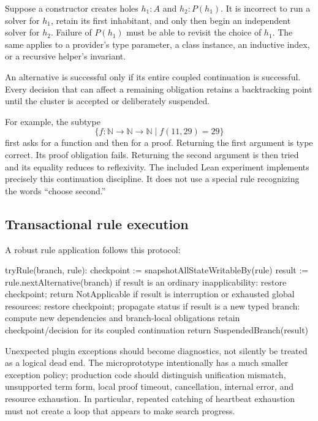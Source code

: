 Suppose a constructor creates holes $h_1:A$ and $h_2:P(h_1)$. It is incorrect to
run a solver for $h_1$, retain its first inhabitant, and only then begin an
independent solver for $h_2$. Failure of $P(h_1)$ must be able to revisit the
choice of $h_1$. The same applies to a provider's type parameter, a class
instance, an inductive index, or a recursive helper's invariant.

\begin{invariant}\label{inv:continuation}
An alternative is successful only if its entire coupled continuation is
successful. Every decision that can affect a remaining obligation retains a
backtracking point until the cluster is accepted or deliberately suspended.
\end{invariant}

For example, the subtype
\[
 \{f:\mathbb N\to\mathbb N\to\mathbb N\mid f(11,29)=29\}
\]
first asks for a function and then for a proof. Returning the first argument is
type correct. Its proof obligation fails. Returning the second argument is then
tried and its equality reduces to reflexivity. The included Lean experiment
implements precisely this continuation discipline. It does not use a special
rule recognizing the words ``choose second.''

\subsection{Transactional rule execution}

A robust rule application follows this protocol:
\begin{Code}
tryRule(branch, rule):
  checkpoint := snapshotAllStateWritableBy(rule)
  result := rule.nextAlternative(branch)
  if result is an ordinary inapplicability:
      restore checkpoint; return NotApplicable
  if result is interruption or exhausted global resources:
      restore checkpoint; propagate status
  if result is a new typed branch:
      compute new dependencies and branch-local obligations
      retain checkpoint/decision for its coupled continuation
      return SuspendedBranch(result)
\end{Code}

Unexpected plugin exceptions should become diagnostics, not silently be treated
as a logical dead end. The microprototype intentionally has a much smaller
exception policy; production code should distinguish unification mismatch,
unsupported term form, local proof timeout, cancellation, internal error, and
resource exhaustion. In particular, repeated catching of heartbeat exhaustion
must not create a loop that appears to make search progress.


